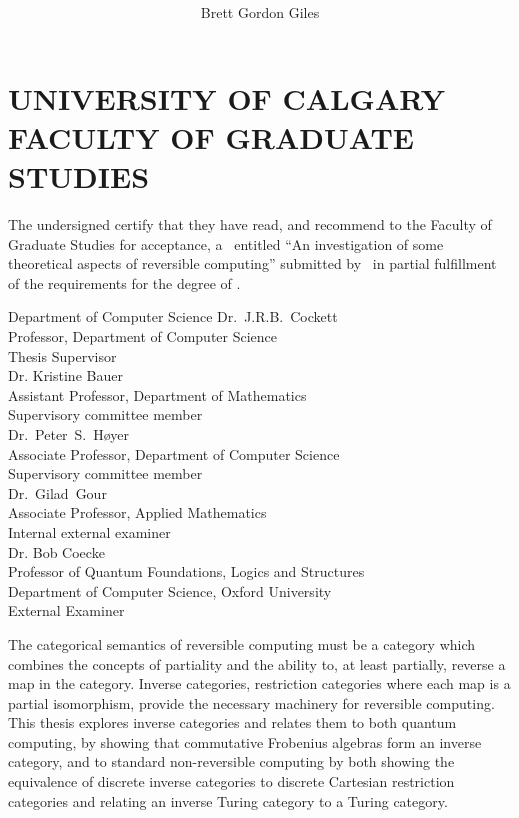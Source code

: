 \documentclass{ucalgthes1}
\title{\thesistitle \\
\bigskip  }
\author{Brett Gordon Giles}
\newcommand{\thesistitle}{An investigation of some theoretical aspects of reversible computing}
\begin{document}
\makethesistitle
{}     %
\setcounter{page}{1}
\chapter*{UNIVERSITY OF CALGARY \\ FACULTY OF GRADUATE STUDIES}
\thispagestyle{empty}
The undersigned certify that they have read, and recommend
to the Faculty of Graduate Studies for acceptance, a \Thesis\ entitled
``\thesistitle'' submitted by \Author\
in partial fulfillment of the requirements for the degree of
\Degree.\\
\begin{signing}{Department of Computer Science}
\signline
Dr.~J.R.B.~Cockett\\
Professor, Department of Computer Science \\
Thesis Supervisor\\
\signline
Dr. Kristine Bauer \\
Assistant Professor, Department of Mathematics \\
Supervisory committee member  \\
\signline
Dr.~Peter~S.~Høyer \\
Associate Professor, Department of Computer Science \\
Supervisory committee member  \\
\newsigncolumn
\signline
Dr.~Gilad~Gour \\
Associate Professor, Applied Mathematics\\
Internal external examiner  \\
\signline
Dr. Bob Coecke\\
Professor of Quantum Foundations, Logics and Structures\\
Department of Computer Science,  Oxford University \\
External Examiner
\end{signing}
%
\newpage
{}
{}
The categorical semantics of reversible computing must be a category which combines the concepts of
partiality and the ability to, at least partially, reverse a map in the category. Inverse
categories, restriction categories where each map is a partial isomorphism, provide the necessary
machinery for reversible computing. This thesis explores inverse categories and relates them to both
quantum computing, by showing that commutative Frobenius algebras form an inverse category, and to
standard non-reversible computing by both showing the equivalence of discrete inverse categories to
discrete Cartesian restriction categories and relating an inverse Turing category to a Turing
category.
\end{document}
